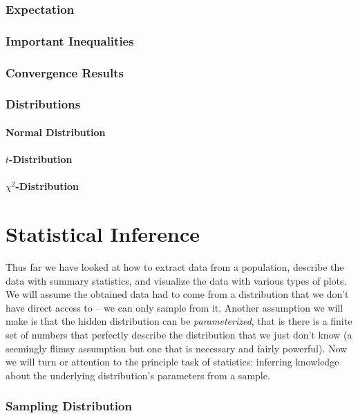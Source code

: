 \documentclass{article}
\begin{document}
\section{Expectation}
\section{Important Inequalities}
\section{Convergence Results}
\section{Distributions}
\subsection{Normal Distribution}
\subsection{$t$-Distribution}
\subsection{$\chi^2$-Distribution}

\newpage
\part{Statistical Inference}

Thus far we have looked at how to extract data from a population, describe the data with summary statistics, and visualize the data with various types of plots.  We will assume the obtained data had to come from a distribution that we don't have direct access to -- we can only sample from it.  Another assumption we will make is that the hidden distribution can be \textit{parameterized}, that is there is a finite set of numbers that perfectly describe the distribution that we just don't know (a seemingly flimsy assumption but one that is necessary and fairly powerful). Now we will turn or attention to the principle task of statistics: inferring knowledge about the underlying distribution's parameters from a sample.

\section{Sampling Distribution}
\end{document}
